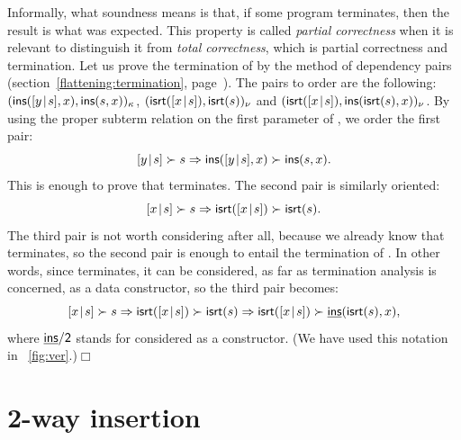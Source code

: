
Informally, what soundness means is that, if some program terminates,
then the result is what was expected. This property is called
\emph{partial correctness} when it is relevant to distinguish it from
\emph{total correctness}, which is partial correctness and
termination. Let us prove the termination of  by the
method of dependency pairs
(section~\ref{flattening:termination},
page~\pageref{flattening:termination}). The pairs to order are
the following: \((\textsf{ins}([{y}\!\mid\!{s}],x), \textsf{ins}(s,x))_\kappa\),
\((\textsf{isrt}([{x}\!\mid\!{s}]), \textsf{isrt}(s))_\nu\) and
\((\textsf{isrt}([{x}\!\mid\!{s}]), \textsf{ins}(\textsf{isrt}(s), x))_\nu\). By
using the proper subterm
relation on the first parameter of ,
we order the first pair:
\begin{equation*}
[{y}\!\mid\!{s}] \succ s \Rightarrow \textsf{ins}([{y}\!\mid\!{s}],x) \succ \textsf{ins}(s,x).
\end{equation*}
This is enough to prove that  terminates. The second pair
is similarly oriented:
\begin{equation*}
[{x}\!\mid\!{s}] \succ s \Rightarrow \textsf{isrt}([{x}\!\mid\!{s}]) \succ \textsf{isrt}(s).
\end{equation*}
The third pair is not worth considering after all, because we already
know that  terminates, so the second pair is enough to
entail the termination of . In
other words, since  terminates, it can be considered, as
far as termination analysis is concerned, as a data constructor, so
the third pair becomes:
\begin{equation*}
  [{x}\!\mid\!{s}] \succ s
  \Rightarrow
  \textsf{isrt}([{x}\!\mid\!{s}]) \succ \textsf{isrt}(s)
  \Rightarrow
  \textsf{isrt}([{x}\!\mid\!{s}]) \succ \underline{\textsf{ins}}(\textsf{isrt}(s), x),
\end{equation*}
where \(\textsf{\underline{\textsf{ins}}/2}\) stands for
 considered as a constructor. (We
have used this notation in \fig~\vref{fig:ver}.)\hfill\(\Box\)

\section{2-way insertion}
\label{sec:2-way}

